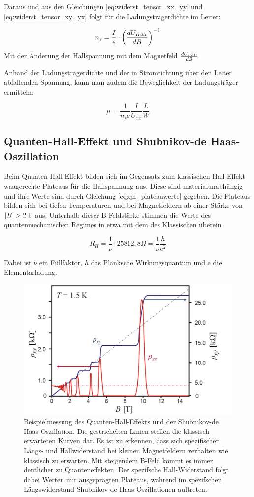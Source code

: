 Daraus und aus den Gleichungen \ref{eq:widerst_tensor_xx_yy} und \ref{eq:widerst_tensor_xy_yx} folgt für die Ladungsträgerdichte im Leiter:
 
 \begin{equation}
 n_s=\frac{I}{e} \cdot \left( \frac{d U_{Hall}}{d B} \right)^{-1}
 \label{eq:ladungsdichte_steig}
 \end{equation}
 Mit der Änderung der Hallspannung mit dem Magnetfeld $\frac{d U_{Hall}}{d B}$. 
 
 Anhand der Ladungsträgerdichte und der in Stromrichtung über den Leiter abfallenden Spannung, kann man zudem die Beweglichkeit der Ladungsträger ermitteln:
 
 \begin{equation}
 \mu=\frac{1}{n_se}\frac{I}{U_{xx}}\frac{L}{W}
 \label{eq:bewegl_masse}
 \end{equation}

\newpage
\subsection{Quanten-Hall-Effekt und Shubnikov-de Haas-Oszillation}

Beim Quanten-Hall-Effekt bilden sich im Gegensatz zum klassischen Hall-Effekt waagerechte Plateaus für die Hallspannung aus. Diese sind materialunabhängig und ihre Werte sind durch Gleichung \ref{eq:qh_plateauwerte} gegeben. Die Plateaus bilden sich bei tiefen Temperaturen und bei Magnetfeldern ab einer Stärke von $|B| > \unit[2]{T}$ aus. Unterhalb dieser B-Feldstärke stimmen die Werte des quantenmechanischen Regimes in etwa mit dem des Klassischen überein. 

\begin{equation}
R_H=\frac{1}{\nu}\cdot 25812,8\Omega =\frac{1}{\nu} \frac{h}{e^2}
\label{eq:qh_plateauwerte}
\end{equation}

Dabei ist $\nu$ ein Füllfaktor, $h$ das Planksche Wirkungsquantum und e die Elementarladung. 

\begin{figure}[h]
\centering
\includegraphics[width=0.5\linewidth]{images/Anleitungsheft/QH_Bsp_Messung_Anleitungsheft}
\caption[Bsp QH Oszill]{Beispielmessung des Quanten-Hall-Effekts und der Shubnikov-de Haas-Oszillation. Die gestrichelten Linien stellen die klassisch erwarteten Kurven dar. Es ist zu erkennen, dass sich spezifischer Längs- und Hallwiderstand bei kleinen Magnetfeldern verhalten wie klassisch zu erwarten. Mit steigendem B-Feld kommt es immer deutlicher zu Quanteneffekten. Der spezifsche Hall-Widerstand folgt dabei Werten mit ausgeprägten Plateaus, während im spezifschen Längswiderstand Shubnikov-de Haas-Oszillationen auftreten.}
\label{fig:QH_Bsp_Messung_Anleitungsheft}
\end{figure}

